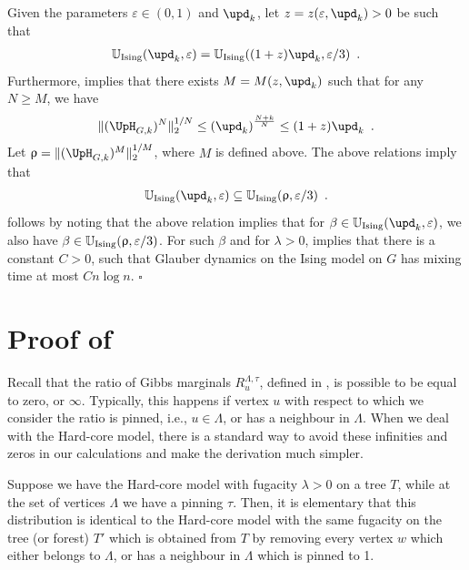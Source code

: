 \documentclass[11pt,reqno]{amsart}
\numberwithin{equation}{section}
\newcommand{\bluepigment}[1]{{\color{blue(pigment)}#1}}
\newcommand{\cadmiumgreen}[1]{{\color{cadmiumgreen}#1}}
\newcommand{\goldenbrown}[1]{{\color{goldenbrown}#1}}
\newcommand{\red}[1]{{\color{red}#1}}
\newcommand{\cconnective}{\goldenbrown{\upd}}
\newcommand{\UnIsing}{{\mathbb{U}_{\rm Ising}}}
\newcommand{\gratio}{{R}}
\newcommand{\nnorm}[3]{\goldenbrown{\|} #1\goldenbrown{\|}^{#2}_{#3}}
\newcommand{\NBMatrix}{\cadmiumgreen{\UpH}_{G,\kk}}
\newcommand{\spreadpoint}{\newpage}
\renewcommand{\spreadpoint}{}
\renewcommand{\bluepigment}[1]{#1}
\renewcommand{\cadmiumgreen}[1]{#1}
\renewcommand{\goldenbrown}[1]{#1}
\renewcommand{\red}[1]{#1}
\newcommand{\kk}{\bluepigment{k}}
\newcommand{\ku}{\red{u}}
\newcommand{\kz}{\cadmiumgreen{z}}
\renewcommand{\kk}{k}
\renewcommand{\ku}{u}
\renewcommand{\kz}{z}
\newcommand{\SingBound}{\uprho}
\begin{document}
Given the parameters $\varepsilon\in (0,1)$ and $\cconnective_{\kk}$,
 let $\kz=\kz(\varepsilon, \cconnective_{\kk})>0$ be  such that
\begin{align}\label{eq:Base4thrm:Ising4CCK}
\UnIsing(\cconnective_{\kk}, \varepsilon)= \UnIsing((1+\kz)\cconnective_{\kk}, \varepsilon/3)\enspace. 
\end{align}
Furthermore,  implies that there exists $M=M(z,\cconnective_{\kk})$ such that for any $N\geq M$,
we have 
\begin{align}\label{eq:Base4thrm:Ising4CCKBB}
\nnorm{(\NBMatrix)^N}{1/N}{2} \leq \left( \cconnective_{\kk}\right)^{\frac{N+k}{N}}\leq (1+\kz)\cconnective_{\kk}\enspace. 
\end{align}
Let $\SingBound=\nnorm{(\NBMatrix)^M}{1/M}{2}$, where $M$ is defined above. The above relations imply that
\begin{align}
\UnIsing(\cconnective_{\kk}, \varepsilon)\subseteq  \UnIsing(\SingBound, \varepsilon/3)\enspace. 
\end{align}
 follows by noting that the above relation implies that for $\beta\in \UnIsing(\cconnective_{\kk}, \varepsilon)$,
we also have $\beta\in \UnIsing(\SingBound, \varepsilon/3)$. For such $\beta$ and for $\lambda>0$,   implies that there is 
a constant $C>0$, such that Glauber dynamics on the Ising model  on $G$ has mixing time at most $C n\log n$.
%
\hfill $\square$


\spreadpoint
\section{Proof of } \label{sec:thrm:GoodPotentialHC}
%
%
Recall that the ratio of Gibbs marginals $\gratio^{\Lambda, \tau}_{\ku}$, defined in 
, is possible to be equal to zero, or $\infty$. Typically, this 
happens if  vertex $\ku$ with respect to which we consider the ratio is pinned, i.e., $\ku \in \Lambda$, 
or has a neighbour in $\Lambda$. When we deal with the Hard-core model, 
there is a standard way to avoid these infinities and zeros in our calculations and make the derivation
much simpler.


Suppose we have the Hard-core model with fugacity $\lambda>0$ on a tree $T$, while at the 
set of vertices $\Lambda$ we have a pinning $\tau$. Then, it is elementary that 
this distribution is identical to the Hard-core model with the same fugacity on the tree (or forest) $T'$ 
which is obtained from $T$ by removing every vertex $w$ which either belongs to $\Lambda$, or 
has a neighbour in $ \Lambda$ which is pinned to 1.
\end{document}
